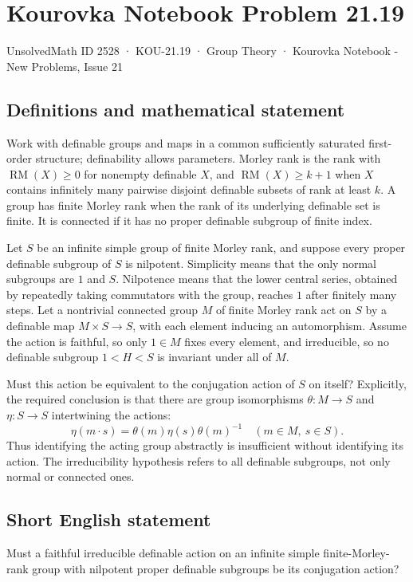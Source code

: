 \documentclass[11pt,a4paper]{article}
\begin{document}
\section*{Kourovka Notebook Problem 21.19}\label{2528}
{\small UnsolvedMath ID 2528 · KOU-21.19 · Group Theory · Kourovka Notebook - New Problems, Issue 21}
\subsection{Definitions and mathematical statement}
Work with definable groups and maps in a common sufficiently saturated
first-order structure; definability allows parameters. Morley rank is
the rank with $\operatorname{RM}(X)\ge0$ for nonempty definable $X$, and
$\operatorname{RM}(X)\ge k+1$ when $X$ contains infinitely many pairwise
disjoint definable subsets of rank at least $k$. A group has finite
Morley rank when the rank of its underlying definable set is finite.
It is connected if it has no proper definable subgroup of finite index.

Let $S$ be an infinite simple group of finite Morley rank, and suppose
every proper definable subgroup of $S$ is nilpotent. Simplicity means
that the only normal subgroups are $1$ and $S$. Nilpotence means that
the lower central series, obtained by repeatedly taking commutators
with the group, reaches $1$ after finitely many steps.
Let a nontrivial connected group $M$ of finite Morley rank act on $S$
by a definable map $M\times S\to S$, with each element inducing an
automorphism. Assume the action is faithful, so only $1\in M$ fixes
every element, and irreducible, so no definable subgroup
$1<H<S$ is invariant under all of $M$.

Must this action be equivalent to the conjugation action of $S$ on
itself? Explicitly, the required conclusion is that there are group
isomorphisms $\theta:M\to S$ and $\eta:S\to S$ intertwining the actions:
\[
 \eta(m\cdot s)=\theta(m)\eta(s)\theta(m)^{-1}
                       \quad(m\in M,\ s\in S).
\]
Thus identifying the acting group abstractly is insufficient without
identifying its action. The irreducibility hypothesis refers to all
definable subgroups, not only normal or connected ones.
\subsection{Short English statement}
Must a faithful irreducible definable action on an infinite simple finite-Morley-rank group with nilpotent proper definable subgroups be its conjugation action?
\end{document}
